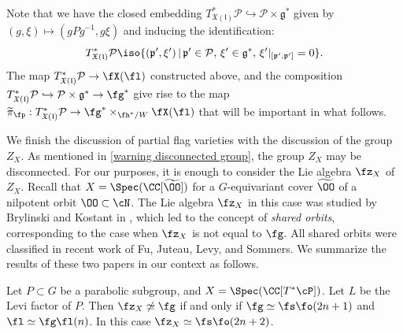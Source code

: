 \documentclass[12pt]{amsart}
\begin{document}

    Note that we have the closed embedding 
    $T^*_{\mathfrak{X}(\mathfrak{l})}\mathcal{P} \hookrightarrow \mathcal{P} \times \mathfrak{g}^*$ given by $(g,\xi) \mapsto (gPg^{-1},g\xi)$ and inducing the identification: 
    \begin{equation*}
    T^*_{\mathfrak{X}(\mathfrak{l})}\mathcal{P}  \iso \{(\mathfrak{p}',\xi')\,|\, \mathfrak{p}' \in \mathcal{P},\, \xi' \in \mathfrak{g}^*,\,\xi'|_{[\mathfrak{p}',\mathfrak{p}']}=0\}.
    \end{equation*}
    The map $T^*_{\mathfrak{X}(\mathfrak{l})}\mathcal{P} \to \fX(\fl)$ constructed above, and the composition $T^*_{\mathfrak{X}(\mathfrak{l})}\mathcal{P} \hookrightarrow \mathcal{P} \times \mathfrak{g}^* \to \fg^*$ give rise to the map $\widetilde{\pi}_\fp: T^*_{\mathfrak{X}(\mathfrak{l})}\mathcal{P}\to \fg^*\times_{\fh^*/W} \fX(\fl)$ that will be important in what follows.
    
    We finish the discussion of partial flag varieties with the discussion of the group $Z_X$. As mentioned in \cref{warning disconnected group}, the group $Z_X$ may be disconnected. For our purposes, it is enough to consider the Lie algebra $\fz_X$ of $Z_X$. Recall that $X=\Spec(\CC[\widetilde{\OO}])$ for a $G$-equivariant cover $\widetilde{\OO}$ of a nilpotent orbit $\OO\subset \cN$. The Lie algebra $\fz_X$ in this case was studied by Brylinski and Kostant in \cite{BrylinskiKostant1994}, which led to the concept of \emph{shared orbits}, corresponding to the case when $\fz_X$ is not equal to $\fg$. All shared orbits were classified in recent work \cite{FJLS2023} of Fu, Juteau, Levy, and Sommers. We summarize the results of these two papers in our context as follows.

    \begin{prop}\label{automotphisms of partial flag}
        Let $P\subset G$ be a parabolic subgroup, and $X=\Spec(\CC[T^*\cP])$. Let $L$ be the Levi factor of $P$. Then $\fz_X\not \simeq \fg$ if and only if $\fg\simeq \fs\fo(2n+1)$ and $\fl\simeq \fg\fl(n)$. In this case $\fz_X\simeq \fs\fo(2n+2)$. 
    \end{prop}
    
\end{document}
